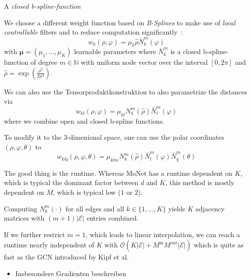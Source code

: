 \documentclass[pdftex,10pt,a4paper]{scrartcl}
\begin{document}
A \emph{closed b-spline-function}

We choose a different weight function based on \emph{B-Splines} to make use of \emph{local controllable} filters and to reduce computation significantly~\cite{Fey2017}:
\begin{equation*}
  w_k(\rho, \varphi) = \mu_k \hat{\rho} \bar{N}_k^m(\varphi)
\end{equation*}
with $\boldsymbol{\mu} = (\mu_1, \ldots, \mu_K )$ learnable parameters where $\bar{N}_k^m$ is a closed b-spline-function of degree $m \in \mathbb{N}$ with uniform node vector over the interval $[0, 2\pi]$ and $\hat{\rho} = \exp(\frac{\rho^2}{2\sigma^2})$.

We can also use the Tensorproduktkonstruktion to also parametrize the distances via
\begin{equation*}
  w_{kl}(\rho, \varphi) = \mu_{kl} N_k^m(\hat{\rho}) \bar{N}_l^m(\varphi)
\end{equation*}
where we combine open and closed b-spline functions.

To modify it to the 3-dimenional space, one can use the polar coordinates $(\rho, \varphi, \theta)$ to
\begin{equation*}
  w_{klq}(\rho, \varphi, \theta) = \mu_{klm} N_k^m(\hat{\rho}) \bar{N}_l^m(\varphi) \bar{N}_q^m(\theta)
\end{equation*}

The good thing is the runtime.
Whereas MoNet has a runtime dependent on $K$, which is typical the dominant factor between $d$ and $K$, this method is mostly dependent on $M$, which is typical low ($1$ or $2$).

Computing $N_k^m(\cdot)$ for all edges and all $k \in \{ 1, \ldots, K \}$ yields $K$ adjacency matrices with $(m + 1) |\mathcal{E}|$ entries combined.

If we further restrict $m = 1$, which leads to linear interpolation, we can reach a runtime nearly independent of $K$ with $\mathcal{O}(K |\mathcal{E}| + M^{\mathrm{in}} M^{\mathrm{out}} |\mathcal{E}|)$ which is quite as fast as the GCN introduced by Kipf et al.



\begin{itemize}
  \item Insbesondere Gradienten beschreiben
\end{itemize}



\end{document}
